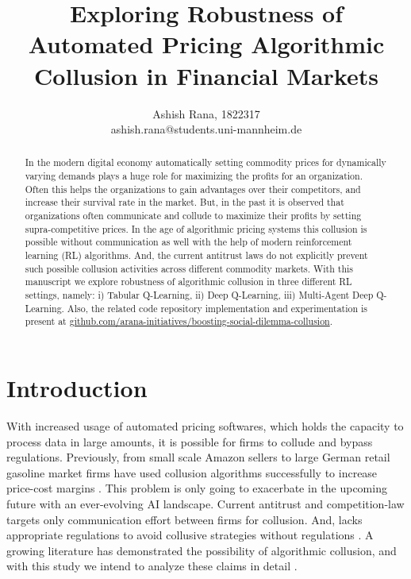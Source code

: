 \documentclass{article}
\title{Exploring Robustness of Automated Pricing Algorithmic Collusion in Financial Markets}
\author{Ashish Rana, 1822317 \\
        ashish.rana@students.uni-mannheim.de}
\begin{document}
\maketitle
\tableofcontents %
\listoftables %
\newpage

\begin{abstract}

In the modern digital economy automatically setting commodity prices for dynamically varying demands plays a huge role for maximizing the profits for an organization.
Often this helps the organizations to gain advantages over their competitors, and increase their survival rate in the market.
But, in the past it is observed that organizations often communicate and collude to maximize their profits by setting supra-competitive prices.
In the age of algorithmic pricing systems this collusion is possible without communication as well with the help of modern reinforcement learning (RL) algorithms.
And, the current antitrust laws do not explicitly prevent such possible collusion activities across different commodity markets.
With this manuscript we explore robustness of algorithmic collusion in three different RL settings, namely: i) Tabular Q-Learning, ii) Deep Q-Learning, iii) Multi-Agent Deep Q-Learning.
Also, the related code repository implementation and experimentation is present at \href{https://github.com/arana-initiatives/boosting-social-dilemma-collusion}{github.com/arana-initiatives/boosting-social-dilemma-collusion}.

\end{abstract}

\section{Introduction}

With increased usage of automated pricing softwares, which holds the capacity to process data in large amounts, it is possible for firms to collude and bypass regulations.
Previously, from small scale Amazon sellers to large German retail gasoline market firms have used collusion algorithms successfully to increase price-cost margins \cite{assad2020algorithmic, kokkoris2020few}.
This problem is only going to exacerbate in the upcoming future with an ever-evolving AI landscape.
Current antitrust and competition-law targets only communication effort between firms for collusion.
And, lacks appropriate regulations to avoid collusive strategies without regulations \cite{calvano2020protecting}.
A growing literature has demonstrated the possibility of algorithmic collusion, and with this study we intend to analyze these claims in detail \cite{calvano2020artificial, klein2021autonomous}.
\end{document}
